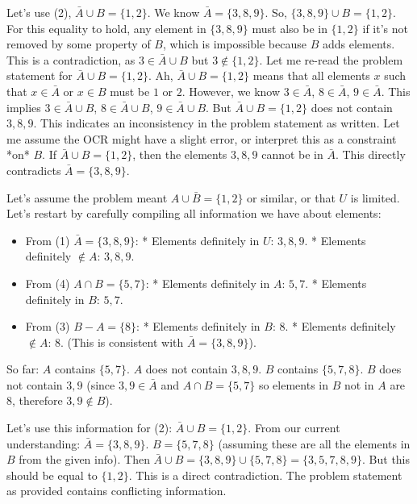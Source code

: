 \documentclass{article}
\begin{document}
Let's use (2), $\bar{A} \cup B = \{1, 2\}$.
We know $\bar{A} = \{3, 8, 9\}$.
So, $\{3, 8, 9\} \cup B = \{1, 2\}$.
For this equality to hold, any element in $\{3, 8, 9\}$ must also be in $\{1, 2\}$ if it's not removed by some property of $B$, which is impossible because $B$ adds elements. This is a contradiction, as $3 \in \bar{A} \cup B$ but $3 \notin \{1, 2\}$. Let me re-read the problem statement for $\bar{A} \cup B = \{1, 2\}$.
Ah, $\bar{A} \cup B = \{1, 2\}$ means that all elements $x$ such that $x \in \bar{A}$ or $x \in B$ must be $1$ or $2$.
However, we know $3 \in \bar{A}$, $8 \in \bar{A}$, $9 \in \bar{A}$. This implies $3 \in \bar{A} \cup B$, $8 \in \bar{A} \cup B$, $9 \in \bar{A} \cup B$.
But $\bar{A} \cup B = \{1, 2\}$ does not contain $3, 8, 9$.
This indicates an inconsistency in the problem statement as written. Let me assume the OCR might have a slight error, or interpret this as a constraint *on* $B$.
If $\bar{A} \cup B = \{1, 2\}$, then the elements $3, 8, 9$ cannot be in $\bar{A}$. This directly contradicts $\bar{A} = \{3, 8, 9\}$.

Let's assume the problem meant $A \cup \bar{B} = \{1, 2\}$ or similar, or that $U$ is limited.
Let's restart by carefully compiling all information we have about elements:
\begin{itemize}
    \item From (1) $\bar{A} = \{3, 8, 9\}$:
        *   Elements definitely in $U$: $3, 8, 9$.
        *   Elements definitely $\notin A$: $3, 8, 9$.
    \item From (4) $A \cap B = \{5, 7\}$:
        *   Elements definitely in $A$: $5, 7$.
        *   Elements definitely in $B$: $5, 7$.
    \item From (3) $B - A = \{8\}$:
        *   Elements definitely in $B$: $8$.
        *   Elements definitely $\notin A$: $8$. (This is consistent with $\bar{A} = \{3, 8, 9\}$).
\end{itemize}
So far:
$A$ contains $\{5, 7\}$. $A$ does not contain $3, 8, 9$.
$B$ contains $\{5, 7, 8\}$. $B$ does not contain $3, 9$ (since $3, 9 \in \bar{A}$ and $A \cap B = \{5,7\}$ so elements in $B$ not in $A$ are $8$, therefore $3, 9 \notin B$).

Let's use this information for (2): $\bar{A} \cup B = \{1, 2\}$.
From our current understanding:
$\bar{A} = \{3, 8, 9\}$.
$B = \{5, 7, 8\}$ (assuming these are all the elements in $B$ from the given info).
Then $\bar{A} \cup B = \{3, 8, 9\} \cup \{5, 7, 8\} = \{3, 5, 7, 8, 9\}$.
But this should be equal to $\{1, 2\}$.
This is a direct contradiction. The problem statement as provided contains conflicting information.
\end{document}
